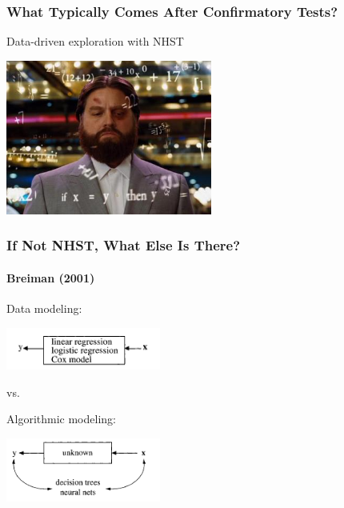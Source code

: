 \documentclass{beamer}\usepackage[]{graphicx}\usepackage[]{color}
\begin{document}
\begin{frame}
\frametitle{What Typically Comes After Confirmatory Tests?}

\begin{center}
Data-driven exploration with NHST
\end{center}

\vspace{-15px}

\begin{center}
\includegraphics[height = 2in]{figure/exploration.jpg}
\end{center}

\end{frame}


\begin{frame}
\frametitle{If Not NHST, What Else Is There?}
\framesubtitle{Breiman (2001)}

\begin{center}
Data modeling:
\end{center}

\begin{center}
\includegraphics[width = 2in]{figure/data_model.png}
\end{center}

\begin{center}
vs.
\end{center}

\begin{center}
Algorithmic modeling:
\end{center}

\begin{center}
\includegraphics[width = 2in]{figure/algo_model.png}
\end{center}

\end{frame}
\end{document}
